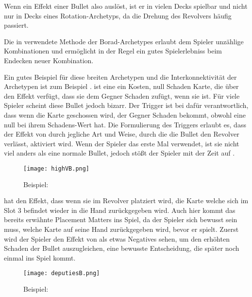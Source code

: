 Wenn ein Effekt einer Bullet also  auslöst, ist er in vielen Decks spielbar und nicht nur in Decks
eines Rotation-Archetyps, da die Drehung des Revolvers häufig passiert.

Die in \FF verwendete Methode der Borad-Archetypes erlaubt dem Spieler unzählige Kombinationen und ermöglicht
in der Regel ein gutes Spielerlebniss beim Endecken neuer Kombination.


Ein gutes Beispiel für diese breiten Archetypen und die Interkonnektivität der Archetypen ist zum Beispiel .
 ist eine ein Kosten, null Schaden Karte, die über den Effekt verfügt, dass sie dem Gegner Schaden zufügt, wenn sie  ist.
Für viele Spieler scheint diese Bullet jedoch bizarr. Der  Trigger ist bei  dafür verantwortlich,
dass wenn die Karte geschossen wird, der Gegner Schaden bekommt, obwohl  eine null bei ihrem Schadens-Wert hat.
Die Formulierung des Triggers erlaubt es, dass der Effekt von  durch jegliche Art und Weise, durch
die die Bullet den Revolver verlässt, aktiviert wird. Wenn der Spieler  das erste Mal verwendet,
ist sie nicht viel anders als eine normale Bullet, jedoch stößt der Spieler mit der Zeit auf .

\begin{figure}[H]
    \centering
    \texttt{[image: highVB.png]}
    \caption{Beispiel: }
\end{figure}


 hat den Effekt, dass wenn sie im Revolver platziert wird, die Karte welche sich im Slot 3 befindet wieder in die Hand
zurückgegeben wird. Auch hier kommt das bereits erwähnte Placement Matters ins Spiel, da der Spieler sich bewusst sein
muss, welche Karte auf seine Hand zurückgegeben wird, bevor er  spielt. Zuerst wird der Spieler den
Effekt von  als etwas Negatives sehen, um den erhöhten Schaden der Bullet auszugleichen,
eine bewusste Entscheidung, die später noch einmal ins Spiel kommt.

\begin{figure}[H]
    \centering
    \texttt{[image: deputiesB.png]}
    \caption{Beispiel: }
\end{figure}

